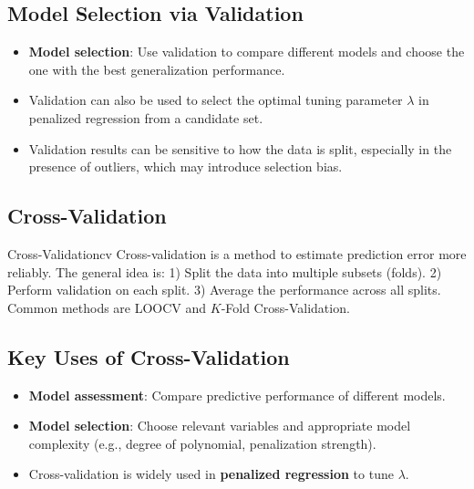 \subsection{Model Selection via Validation}

\begin{itemize}
\item \textbf{Model selection}: Use validation to compare different models and choose the one with the best generalization performance.

\item Validation can also be used to select the optimal tuning parameter $\lambda$ in penalized regression from a candidate set.

\item Validation results can be sensitive to how the data is split, especially in the presence of outliers, which may introduce selection bias.
\end{itemize}

\subsection{Cross-Validation}

\begin{defn}{Cross-Validation}{cv}
Cross-validation is a method to estimate prediction error more reliably. The general idea is: 1) Split the data into multiple subsets (folds). 2) Perform validation on each split. 3) Average the performance across all splits. Common methods are LOOCV and $K$-Fold Cross-Validation.
\end{defn}

\subsection{Key Uses of Cross-Validation}

\begin{notebox}
\begin{itemize}
\item \textbf{Model assessment}: Compare predictive performance of different models.

\item \textbf{Model selection}: Choose relevant variables and appropriate model complexity (e.g., degree of polynomial, penalization strength).

\item Cross-validation is widely used in \textbf{penalized regression} to tune $\lambda$.
\end{itemize}
\end{notebox}

